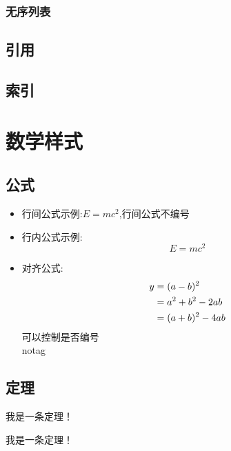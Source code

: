     \subsubsection{无序列表}
\subsection{引用}
\subsection{索引}
\clearpage
\section[数学样式]{数学样式}
\subsection{公式}
    \begin{itemize}
        \item 行间公式示例:$E=mc^2$,行间公式不编号
        \item 行内公式示例:\begin{equation}
            E=mc^2
        \end{equation}
        \item 对齐公式:\begin{align}
            y &=(a-b)^2\\
            &=a^2+b^2-2ab \notag\\
            &=(a+b)^2-4ab
        \end{align}
        可以控制是否编号\\notag
    \end{itemize}
   
\subsection{定理}
    \begin{theorem}
        我是一条定理！
    \end{theorem}
    \begin{theorem}
        我是一条定理！
    \end{theorem}
